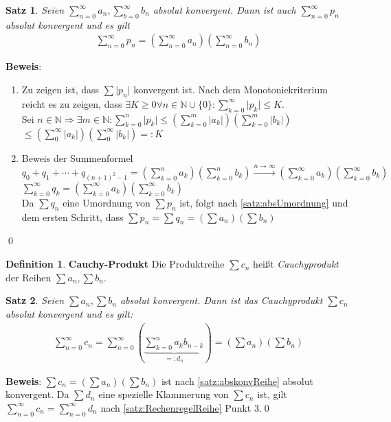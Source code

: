 \documentclass[ngerman,titlepage,twoside, parskip=half*]{scrreprt}
\newcommand*{\N}{\mathbb{N}}
\theoremstyle{plain}
\newtheorem{theorem}{Satz}[section]
\theoremstyle{definition}
\newtheorem{definition}{Definition}
\theoremstyle{remark}
\newcommand*{\abs}[2][]{#1\lvert#2#1\rvert}
\begin{document}
\begin{theorem}
\label{satz:abskonvReihe}
Seien $\sum_{n=0}^\infty a_n, \sum_{b=0}^\infty b_n$ absolut konvergent. Dann ist auch $\sum_{n=0}^\infty p_n$ absolut
konvergent und es gilt
\begin{gather*}\sum_{n=0}^\infty p_n=\left(\sum_{n=0}^\infty a_n\right)\left(\sum_{n=0}^\infty b_n\right)\end{gather*}
\end{theorem}
\textbf{Beweis}:
\begin{enumerate}[1. Schr{i}tt]
  \item Zu zeigen ist, dass $\sum \abs{p_n}$ konvergent ist. Nach dem Monotoniekriterium reicht es zu zeigen, dass
    $\exists K \geq 0 \forall n \in \N \cup \{0\}\colon\sum_{k=0}^\infty \abs{p_k}\leq K$.\\
    Sei $n \in \N \Rightarrow \exists m \in \N \colon \sum_{k=0}^n \abs{p_k}\leq (\sum_{k=0}^m \abs{a_k})(\sum_{k=0}^m \abs{b_k})$\\
    $\leq
    (\sum_0^\infty \abs{a_k})(\sum_0^\infty \abs{b_k})=:K$
  \item Beweis der Summenformel
    $q_0+q_1+\cdots +q_{(n+1)^2-1}=(\sum_{k=0}^n a_k)(\sum_{k=0}^n b_k)\stackrel{n\rightarrow \infty}{\rightarrow}
    (\sum_{k=0}^\infty a_k)(\sum_{k=0}^\infty b_k)$\\
    $\sum_{k=0}^\infty q_k=(\sum_{k=0}^\infty a_k)(\sum_{k=0}^\infty b_k)$\\
    Da $\sum q_n$ eine Umordnung von $\sum p_n$ ist, folgt nach \autoref{satz:absUmordnung} und dem ersten Schritt, dass
    $\sum p_n=\sum q_n = (\sum a_n)(\sum b_n)$
\end{enumerate}
\qed

\begin{definition}
\textbf{Cauchy-Produkt} %
Die Produktreihe $\sum c_n$ heißt \emph{Cauchyprodukt} der Reihen $\sum a_n, \sum b_n$.
\end{definition}

\begin{theorem}
Seien $\sum a_n, \sum b_n$ absolut konvergent. Dann ist das Cauchyprodukt $\sum c_n$ absolut konvergent und es gilt:
\begin{gather*}\sum_{n=0}^\infty c_n = \sum_{n=0}^\infty \left(\underbrace{\sum_{k=0}^n a_k b_{n-k}}_{=:d_n}\right) = \left(\sum a_n\right)\left(\sum b_n\right)\end{gather*}
\end{theorem}
\textbf{Beweis}: $\sum c_n=(\sum a_n)(\sum b_n)$ ist nach \autoref{satz:abskonvReihe} absolut konvergent. Da $\sum d_n$ eine
spezielle Klammerung von $\sum c_n$ ist, gilt $\sum_{n=0}^\infty c_n=\sum_{n=0}^\infty d_n$ nach
\autoref{satz:RechenregelReihe} Punkt 3.\qed
\end{document}
